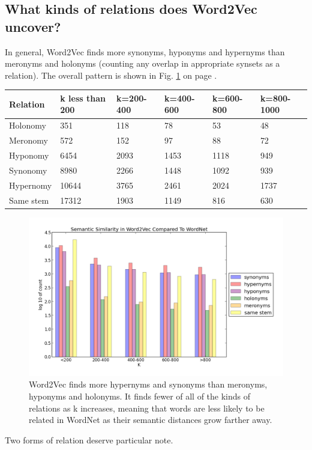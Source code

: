 \documentclass{article}
\begin{document}
\subsection{What kinds of relations does Word2Vec uncover?} \label{binary}
In general, Word2Vec finds more synonyms, hyponyms and hypernyms than meronyms and holonyms (counting any overlap in appropriate synsets as a relation). The overall pattern is shown in Fig. \ref{fig:all} on page \pageref{fig:all}.
\begin{center}
\centering
    \begin{tabular}{ | l | l | l | l | l | l |}
    \hline
Relation & k less than 200 & k=200-400 & k=400-600 & k=600-800 & k=800-1000 \\  \hline
Holonomy &351 & 118 & 78 & 53 & 48\\  \hline
Meronomy &572 & 152 & 97 & 88 & 72\\  \hline
Hyponomy &6454 & 2093 & 1453 & 1118 & 949\\  \hline
Synonomy &8980 & 2266 & 1448 & 1092 & 939\\  \hline
Hypernomy &10644 & 3765 & 2461 & 2024 & 1737\\  \hline
Same stem &17312 & 1903 & 1149 & 816 & 630\\  \hline
    \end{tabular}
\end{center}
\begin{figure}[!hb]
  \includegraphics[scale=.5]{all.png}
  \caption{Word2Vec finds more hypernyms and synonyms than meronyms, hyponyms and holonyms. It finds fewer of all of the kinds of relations as k increases, meaning that words are less likely to be related in WordNet as their semantic distances grow farther away.}
  \label{fig:all}
\end{figure}
Two forms of relation deserve particular note. 
\end{document}
